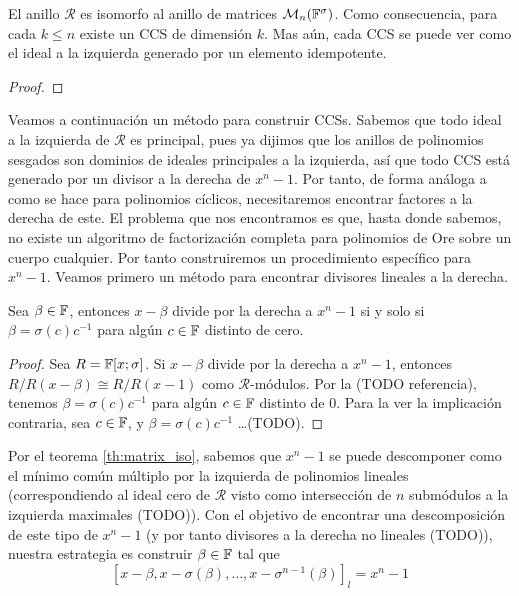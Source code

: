 

\begin{theorem}\label{th:matrix_iso}
    El anillo \(\mathcal{R}\) es isomorfo al anillo de matrices \(\mathcal{M}_n(\mathbb{F}^\sigma)\). Como consecuencia, para cada \(k \leq n\) existe un CCS de dimensión \(k\). Mas aún, cada CCS se puede ver como el ideal a la izquierda generado por un elemento idempotente.
\end{theorem}

\begin{proof}

\end{proof}

Veamos a continuación un método para construir CCSs. Sabemos que todo ideal a la izquierda de \(\mathcal{R}\) es principal, pues ya dijimos que los anillos de polinomios sesgados son dominios de ideales principales a la izquierda, así que todo CCS está generado por un divisor a la derecha de \(x^n - 1\). Por tanto, de forma análoga a como se hace para polinomios cíclicos, necesitaremos encontrar factores a la derecha de este. El problema que nos encontramos es que, hasta donde sabemos, no existe un algoritmo de factorización completa para polinomios de Ore sobre un cuerpo cualquier. Por tanto construiremos un procedimiento específico para \(x^n - 1\). Veamos primero un método para encontrar divisores lineales a la derecha.

\begin{proposition}
\label{prop:x_beta}
    Sea \(\beta \in \mathbb{F}\), entonces  \(x - \beta\) divide por la derecha a  \(x^n -1\) si y solo si  \(\beta = \sigma(c)c^{-1}\) para algún  \(c \in \mathbb{F}\) distinto de cero.
\end{proposition}

\begin{proof}
    Sea \(R = \mathbb{F}[x; \sigma]\). Si \(x - \beta\) divide por la derecha a \(x^n - 1\), entonces \(R/R(x - \beta) \cong R/R(x-1)\) como \(\mathcal{R}\)-módulos. Por la (TODO referencia), tenemos \(\beta = \sigma(c)c^{-1}\) para algún \(c \in \mathbb{F}\) distinto de 0. Para la ver la implicación contraria, sea  \(c \in \mathbb{F}\), y  \(\beta = \sigma(c)c^{-1}\) \dots (TODO).
\end{proof}

Por el teorema \ref{th:matrix_iso}, sabemos que \(x^n - 1\) se puede descomponer como el mínimo común múltiplo por la izquierda de polinomios lineales (correspondiendo al ideal cero de \(\mathcal{R}\) visto como intersección de \(n\) submódulos a la izquierda maximales (TODO)). Con el objetivo de encontrar una descomposición de este tipo de \(x^n - 1\) (y por tanto divisores a la derecha no lineales (TODO)), nuestra estrategia es construir \(\beta \in \mathbb{F}\) tal que
\begin{equation}
\label{eq:lclm}
[x - \beta, x - \sigma(\beta), \dots, x - \sigma^{n-1}(\beta)]_l = x^n -1
\end{equation}

